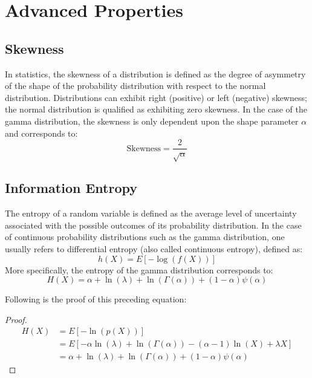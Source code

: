 \documentclass[12pt]{article}
\begin{document}

\pagebreak
\section{Advanced Properties}
\subsection{Skewness}
In statistics, the skewness of a distribution is defined as the degree of asymmetry of the shape of the probability
distribution with respect to the normal distribution. Distributions can exhibit right (positive) or left (negative)
skewness; the normal distribution is qualified as exhibiting zero skewness. In the case of the gamma distribution, the
skewness is only dependent upon the shape parameter $\alpha$ and corresponds to\cite{chenLearnSkewness2021,
wikipediaGammaDistribution2022}:
\begin{equation}
	\text{Skewness} = \frac{2}{\sqrt{\alpha}}
\end{equation}

\subsection{Information Entropy}
The entropy of a random variable is defined as the average level of uncertainty associated with the possible outcomes
of its probability distribution. In the case of continuous probability distributions such as the gamma
distribution, one usually refers to differential entropy (also called continuous entropy), defined
as\cite{wikipediaDifferentialEntropy2022, wikipediaGammaDistribution2022}:
\begin{equation}
	h(X) = E[-\log(f(X))]
\end{equation}
More specifically, the entropy of the gamma distribution corresponds to:
\begin{equation}
	H(X) = \alpha + \ln(\lambda) + \ln(\Gamma(\alpha)) + (1-\alpha)\psi(\alpha)
\end{equation}

\pagebreak
\noindent Following is the proof of this preceding equation:
\begin{proof}
	\begin{equation}
		\begin{split}
			H(X)	&=	E[-\ln(p(X))]\\
					&=	E[-\alpha\ln(\lambda) + \ln(\Gamma(\alpha)) - (\alpha-1)\ln(X) + \lambda X]\\
					&=	\alpha + \ln(\lambda) + \ln(\Gamma(\alpha)) + (1-\alpha)\psi(\alpha)
		\end{split}
	\end{equation}
\end{proof}
\end{document}
